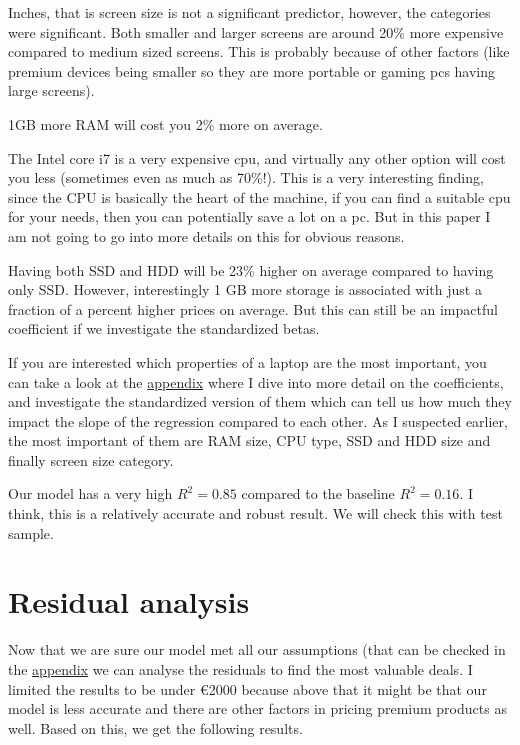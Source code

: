 \documentclass[
]{article}
\begin{document}
Inches, that is screen size is not a significant predictor, however, the
categories were significant. Both smaller and larger screens are around
20\% more expensive compared to medium sized screens. This is probably
because of other factors (like premium devices being smaller so they are
more portable or gaming pcs having large screens).

1GB more RAM will cost you 2\% more on average.

The Intel core i7 is a very expensive cpu, and virtually any other
option will cost you less (sometimes even as much as 70\%!). This is a
very interesting finding, since the CPU is basically the heart of the
machine, if you can find a suitable cpu for your needs, then you can
potentially save a lot on a pc. But in this paper I am not going to go
into more details on this for obvious reasons.

Having both SSD and HDD will be 23\% higher on average compared to
having only SSD. However, interestingly 1 GB more storage is associated
with just a fraction of a percent higher prices on average. But this can
still be an impactful coefficient if we investigate the standardized
betas.

If you are interested which properties of a laptop are the most
important, you can take a look at the
\protect\hyperlink{standardized-residuals}{appendix} where I dive into
more detail on the coefficients, and investigate the standardized
version of them which can tell us how much they impact the slope of the
regression compared to each other. As I suspected earlier, the most
important of them are RAM size, CPU type, SSD and HDD size and finally
screen size category.

Our model has a very high \(R^2=0.85\) compared to the baseline
\(R^2=0.16\). I think, this is a relatively accurate and robust result.
We will check this with test sample.

\hypertarget{residual-analysis}{%
\section{Residual analysis}\label{residual-analysis}}

Now that we are sure our model met all our assumptions (that can be
checked in the \protect\hyperlink{model-assumptions}{appendix} we can
analyse the residuals to find the most valuable deals. I limited the
results to be under €2000 because above that it might be that our model
is less accurate and there are other factors in pricing premium products
as well. Based on this, we get the following results.
\end{document}

